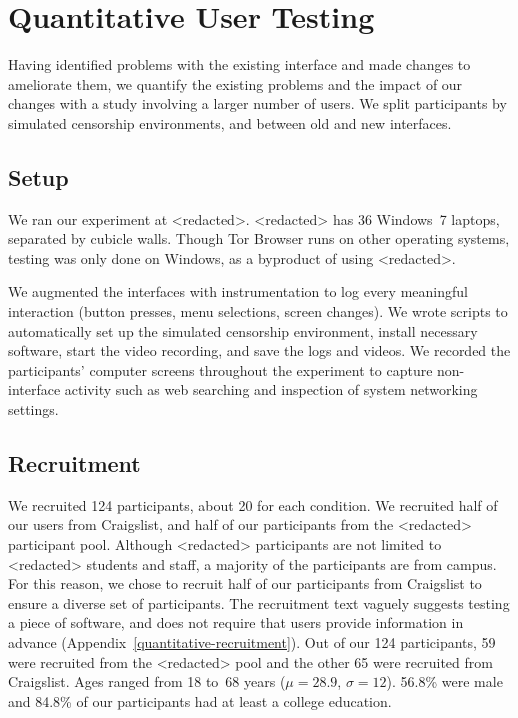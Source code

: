 \documentclass[USenglish,oneside,twocolumn]{article}
\begin{document}
\section{Quantitative User Testing}
\label{sec:quantitative}

{\color {red} 
Having identified problems with the existing interface
and made changes to ameliorate them,
we quantify the existing problems
and the impact of our changes with a study involving a larger number of users.
We split participants by simulated censorship environments,
and between old and new interfaces.

\subsection{Setup}
We ran our experiment at <redacted>.
<redacted> %
has 36 Windows~7 laptops, separated by cubicle walls. 
Though Tor Browser runs on other operating systems,
testing was only done on Windows, as a byproduct of using <redacted>. %

We augmented the interfaces with instrumentation 
to log every meaningful interaction
(button presses, menu selections, screen changes).
We wrote scripts to automatically set up the simulated censorship environment, install necessary software, 
start the video recording, and save the logs and videos.
We recorded the participants' computer screens
throughout the experiment to capture non-interface activity such as 
web searching and inspection of system networking settings.

\subsection{Recruitment}
We recruited 124 participants, about 20 for each
condition. We recruited half of our users from Craigslist, and half of our participants from 
the <redacted> %
participant pool. Although <redacted> %
participants are not limited to <redacted> %
students and staff,
a majority of the participants are from campus. For this reason, we chose to recruit 
half of our participants from Craigslist to ensure a diverse set of participants. 
The recruitment text vaguely suggests testing a piece of software, and does not require
that users provide information in advance (Appendix~\ref{quantitative-recruitment}). 
Out of our 124 participants, 59 were recruited from the <redacted> %
pool and the other 65 were
recruited from Craigslist. Ages ranged from 18 to~68 years
($\mu = 28.9$, $\sigma = 12$). 56.8\% were male and 
84.8\% of our participants had at least a college education.

}
\end{document}
